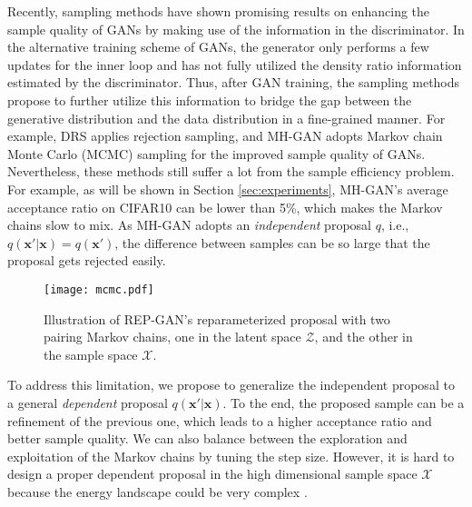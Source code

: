 \documentclass[runningheads]{llncs}
\newcommand{\bx}{\mathbf{x}}
\newcommand{\cX}{\mathcal{X}}
\newcommand{\cZ}{\mathcal{Z}}
\newcommand{\<}{\left\langle}
\renewcommand{\>}{\right\rangle}
\begin{document}
Recently, sampling methods have shown promising results on enhancing the sample quality of GANs by making use of 
the information in the discriminator.
In the alternative training scheme of GANs, the generator only performs a few updates for the inner loop and has not fully utilized the density ratio information estimated by the discriminator. Thus, after GAN training, the sampling methods propose to further utilize this information to bridge the gap between the generative distribution and the data distribution in a fine-grained manner.
For example, DRS \cite{azadi2019discriminator} applies rejection sampling, and MH-GAN \cite{turner2019metropolis} adopts Markov chain Monte Carlo (MCMC) sampling for the improved sample quality of GANs. Nevertheless, these methods still suffer a lot from the sample efficiency problem. For example, as will be shown in Section \ref{sec:experiments}, MH-GAN's average acceptance ratio on CIFAR10 can be lower than 5\%, which makes the Markov chains slow to mix. As MH-GAN adopts an \emph{independent} proposal $q$, i.e., $q(\bx'|\bx)=q(\bx')$, the difference between samples can be so large that the proposal gets rejected easily. 

\begin{figure}[t]
\centering
\texttt{[image: mcmc.pdf]}
\caption{Illustration of REP-GAN's reparameterized proposal with two pairing Markov chains, one in the latent space $\cZ$, and the other in the sample space $\cX$. }
\label{fig:pairing-chains}
\end{figure}


To address this limitation, we propose to generalize the independent proposal to a general \emph{dependent} proposal $q(\bx'|\bx)$. To the end, the proposed sample can be a refinement of the previous one, which leads to a higher acceptance ratio and better sample quality. We can also balance between the exploration and exploitation of the Markov chains by tuning the step size. However, it is hard to design a proper dependent proposal in the high dimensional sample space $\cX$ because the energy landscape could be very complex \cite{neal2010MCMC}. 
\end{document}
